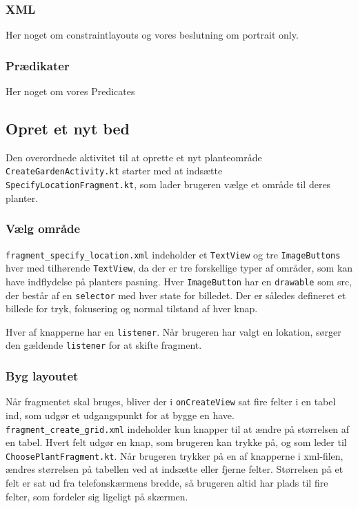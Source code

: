 \subsubsection{XML}
Her noget om constraintlayouts og vores beslutning om portrait only.

\subsubsection{Prædikater}
Her noget om vores Predicates

\subsection{Opret et nyt bed}
Den overordnede aktivitet til at oprette et nyt planteområde \texttt{CreateGardenActivity.kt} starter med at indsætte \texttt{SpecifyLocationFragment.kt}, som lader brugeren vælge et område til deres planter.

\subsubsection{Vælg område}
\texttt{fragment\_specify\_location.xml} indeholder et \texttt{TextView} og tre \texttt{ImageButtons} hver med tilhørende \texttt{TextView}, da der er tre forskellige typer af områder, som kan have indflydelse på planters pasning. Hver \texttt{ImageButton} har en \texttt{drawable} som src, der består af en \texttt{selector} med hver state for billedet. Der er således defineret et billede for tryk, fokusering og normal tilstand af hver knap.

Hver af knapperne har en \texttt{listener}. Når brugeren har valgt en lokation, sørger den gældende \texttt{listener} for at skifte fragment.

\subsubsection{Byg layoutet}
Når fragmentet skal bruges, bliver der i \texttt{onCreateView} sat fire felter i en tabel ind, som udgør et udgangspunkt for at bygge en have. \texttt{fragment\_create\_grid.xml} indeholder kun knapper til at ændre på størrelsen af en tabel. Hvert felt udgør en knap, som brugeren kan trykke på, og som leder til \texttt{ChoosePlantFragment.kt}. Når brugeren trykker på en af knapperne i xml-filen, ændres størrelsen på tabellen ved at indsætte eller fjerne felter. Størrelsen på et felt er sat ud fra telefonskærmens bredde, så brugeren altid har plads til fire felter, som fordeler sig ligeligt på skærmen. 

